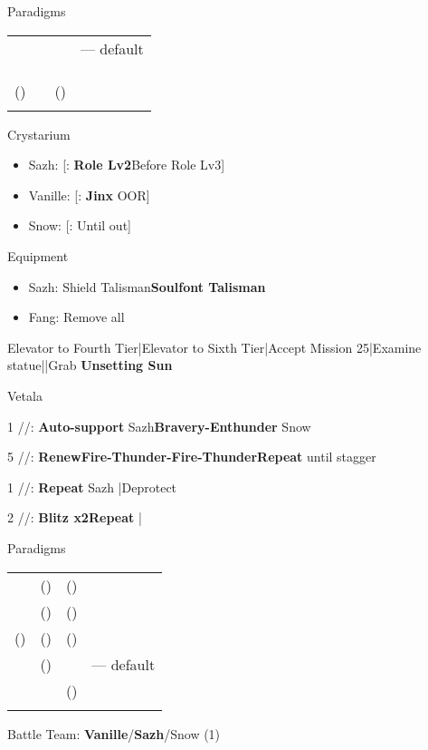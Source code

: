 \begin{menu}
	\item Paradigms
	\begin{tabular}{cccl}
		\syn   & \sab & \rav   & --- default \\
		\com   & \med & \com   &             \\
		\syn   & \med & \com   &             \\
		\com   & \sab & \com   &             \\
		(\rav) & \sab & (\rav) &             \\
		\com   & \rav & \com   &
	\end{tabular}
	\item Crystarium
	\begin{itemize}
		\item Sazh: [\rav: \textbf{Role Lv2}\to Before Role Lv3]
		\item Vanille: [\sab: \textbf{Jinx} OOR]
		\item Snow: [\sen: Until out]
	\end{itemize}
	\item Equipment
	\begin{itemize}
		\item Sazh: Shield Talisman\to \textbf{Soulfont Talisman}
		\item Fang: Remove all
	\end{itemize}
\end{menu}
\begin{mainlist}
	\item Elevator to Fourth Tier|Elevator to Sixth Tier|Accept Mission 25|Examine statue|\skip|Grab \textbf{Unsetting Sun}
\end{mainlist}
\begin{fight}{Vetala}
	\item [1] \syn/\sab/\rav: \textbf{Auto-support} Sazh\to \textbf{Bravery-Enthunder} Snow
	\item [5] \rav/\sab/\rav: \textbf{Renew}\to \textbf{Fire-Thunder-Fire-Thunder}\to \textbf{Repeat} until stagger
	\item [1] \syn/\sab/\rav: \textbf{Repeat} Sazh |Deprotect
	\item [2] \com/\med/\com: \textbf{Blitz x2}\to \textbf{Repeat} |\skip
\end{fight}
\begin{menu}
	\item Paradigms
	\begin{tabular}{cccl}
		\syn & (\rav)   & (\sen) &             \\
		\com & (\rav)   & (\rav) &             \\
		(\rav) & (\rav) & (\sen) &             \\
		\com & (\rav)   & \com   & --- default \\
		\rav   & \sab   & (\sen) &             \\
		\com   & \rav   & \com   &
	\end{tabular}
	\item Battle Team: \textbf{Vanille}/\textbf{Sazh}/Snow (1)
\end{menu}
